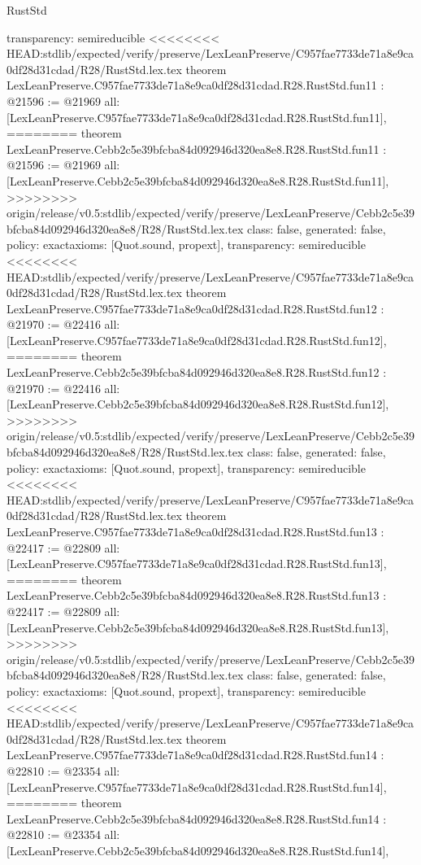 \begin{lexlean}{RustStd}
\begin{coremodule}
{\begin{coremodule}
{{{{{{{{{{{{{{  transparency: semireducible
}
<<<<<<<< HEAD:stdlib/expected/verify/preserve/LexLeanPreserve/C957fae7733de71a8e9ca0df28d31cdad/R28/RustStd.lex.tex
theorem LexLeanPreserve.C957fae7733de71a8e9ca0df28d31cdad.R28.RustStd.fun11 : @21596 := @21969 {
  all: [LexLeanPreserve.C957fae7733de71a8e9ca0df28d31cdad.R28.RustStd.fun11],
========
theorem LexLeanPreserve.Cebb2c5e39bfcba84d092946d320ea8e8.R28.RustStd.fun11 : @21596 := @21969 {
  all: [LexLeanPreserve.Cebb2c5e39bfcba84d092946d320ea8e8.R28.RustStd.fun11],
>>>>>>>> origin/release/v0.5:stdlib/expected/verify/preserve/LexLeanPreserve/Cebb2c5e39bfcba84d092946d320ea8e8/R28/RustStd.lex.tex
  class: false,
  generated: false,
  policy: exact{axioms: [Quot.sound, propext]},
  transparency: semireducible
}
<<<<<<<< HEAD:stdlib/expected/verify/preserve/LexLeanPreserve/C957fae7733de71a8e9ca0df28d31cdad/R28/RustStd.lex.tex
theorem LexLeanPreserve.C957fae7733de71a8e9ca0df28d31cdad.R28.RustStd.fun12 : @21970 := @22416 {
  all: [LexLeanPreserve.C957fae7733de71a8e9ca0df28d31cdad.R28.RustStd.fun12],
========
theorem LexLeanPreserve.Cebb2c5e39bfcba84d092946d320ea8e8.R28.RustStd.fun12 : @21970 := @22416 {
  all: [LexLeanPreserve.Cebb2c5e39bfcba84d092946d320ea8e8.R28.RustStd.fun12],
>>>>>>>> origin/release/v0.5:stdlib/expected/verify/preserve/LexLeanPreserve/Cebb2c5e39bfcba84d092946d320ea8e8/R28/RustStd.lex.tex
  class: false,
  generated: false,
  policy: exact{axioms: [Quot.sound, propext]},
  transparency: semireducible
}
<<<<<<<< HEAD:stdlib/expected/verify/preserve/LexLeanPreserve/C957fae7733de71a8e9ca0df28d31cdad/R28/RustStd.lex.tex
theorem LexLeanPreserve.C957fae7733de71a8e9ca0df28d31cdad.R28.RustStd.fun13 : @22417 := @22809 {
  all: [LexLeanPreserve.C957fae7733de71a8e9ca0df28d31cdad.R28.RustStd.fun13],
========
theorem LexLeanPreserve.Cebb2c5e39bfcba84d092946d320ea8e8.R28.RustStd.fun13 : @22417 := @22809 {
  all: [LexLeanPreserve.Cebb2c5e39bfcba84d092946d320ea8e8.R28.RustStd.fun13],
>>>>>>>> origin/release/v0.5:stdlib/expected/verify/preserve/LexLeanPreserve/Cebb2c5e39bfcba84d092946d320ea8e8/R28/RustStd.lex.tex
  class: false,
  generated: false,
  policy: exact{axioms: [Quot.sound, propext]},
  transparency: semireducible
}
<<<<<<<< HEAD:stdlib/expected/verify/preserve/LexLeanPreserve/C957fae7733de71a8e9ca0df28d31cdad/R28/RustStd.lex.tex
theorem LexLeanPreserve.C957fae7733de71a8e9ca0df28d31cdad.R28.RustStd.fun14 : @22810 := @23354 {
  all: [LexLeanPreserve.C957fae7733de71a8e9ca0df28d31cdad.R28.RustStd.fun14],
========
theorem LexLeanPreserve.Cebb2c5e39bfcba84d092946d320ea8e8.R28.RustStd.fun14 : @22810 := @23354 {
  all: [LexLeanPreserve.Cebb2c5e39bfcba84d092946d320ea8e8.R28.RustStd.fun14],
}}}}}}}}}}}}}}}}}}
\end{coremodule}}
\end{coremodule}
\end{lexlean}
